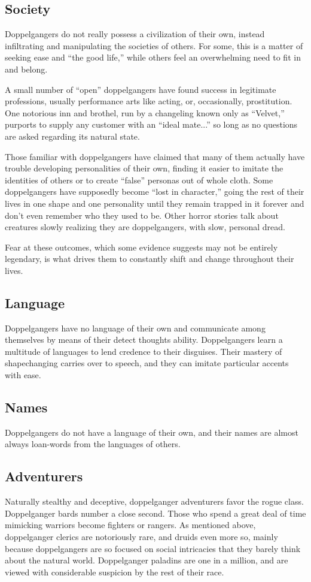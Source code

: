 \subsection{Society}
{Doppelgangers do not really possess a civilization of their own, instead infiltrating and manipulating the societies of others. For some, this is a matter of seeking ease and “the good life,” while others feel an overwhelming need to fit in and belong.

A small number of “open” doppelgangers have found success in legitimate professions, usually performance arts like acting, or, occasionally, prostitution. One notorious inn and brothel, run by a changeling known only as “Velvet,” purports to supply any customer with an “ideal mate...” so long as no questions are asked regarding its natural state.

Those familiar with doppelgangers have claimed that many of them actually have trouble developing personalities of their own, finding it easier to imitate the identities of others or to create “false” personas out of whole cloth. Some doppelgangers have supposedly become “lost in character,” going the rest of their lives in one shape and one personality until they remain trapped in it forever and don’t even remember who they used to be. Other horror stories talk about creatures slowly realizing they are doppelgangers, with slow, personal dread.

Fear at these outcomes, which some evidence suggests may not be entirely legendary, is what drives them to constantly shift and change throughout their lives. \cite{d-hb}}

\subsection{Language}
{Doppelgangers have no language of their own and communicate among themselves by means of their detect thoughts ability. Doppelgangers learn a multitude of languages to lend credence to their disguises. Their mastery of shapechanging carries over to speech, and they can imitate particular accents with ease. \cite{d-destiny}}

\subsection{Names}
{Doppelgangers do not have a language of their own, and their names are almost always loan-words from the languages of others. \cite{d-hb}}

\subsection{Adventurers}
{Naturally stealthy and deceptive, doppelganger adventurers favor the rogue class. Doppelganger bards number a close second. Those who spend a great deal of time mimicking warriors become fighters or rangers. As mentioned above, doppelganger clerics are notoriously rare, and druids even more so, mainly because doppelgangers are so focused on social intricacies that they barely think about the natural world. Doppelganger paladins are one in a million, and are viewed with considerable suspicion by the rest of their race. \cite{d-destiny}}

